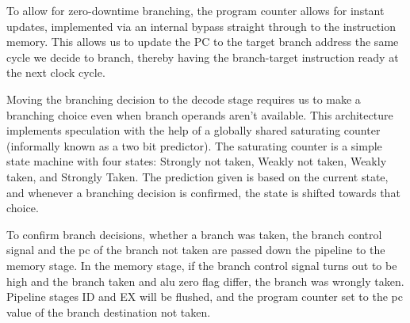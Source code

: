 To allow for zero-downtime branching, the program counter allows for instant updates, implemented via an internal bypass straight through to the instruction memory.
This allows us to update the PC to the target branch address the same cycle we decide to branch, thereby having the branch-target instruction ready at the next clock cycle.

Moving the branching decision to the decode stage requires us to make a branching choice even when branch operands aren't available.
This architecture implements speculation with the help of a globally shared saturating counter (informally known as a two bit predictor).
The saturating counter is a simple state machine with four states: Strongly not taken, Weakly not taken, Weakly taken, and Strongly Taken.
The prediction given is based on the current state, and whenever a branching decision is confirmed, the state is shifted towards that choice.

To confirm branch decisions, whether a branch was taken, the branch control signal and the pc of the branch not taken are passed down the pipeline to the memory stage.
In the memory stage, if the branch control signal turns out to be high and the branch taken and alu zero flag differ, the branch was wrongly taken.
Pipeline stages ID and EX will be flushed, and the program counter set to the pc value of the branch destination not taken.
